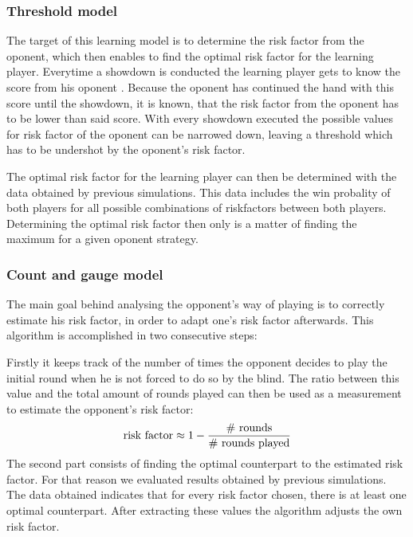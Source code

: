 \documentclass[11pt]{article}
\begin{document}
\subsubsection{Threshold model}

The target of this learning model is to determine the risk factor from the oponent, which then enables to find the optimal risk factor for the learning player.
Everytime a showdown is conducted the learning player gets to know the score from his oponent . Because the oponent has continued the hand with this score until the showdown, it is known, that the risk factor from the oponent has to be lower than said score. With every showdown executed the possible values for risk factor of the oponent can be narrowed down, leaving a threshold which has to be undershot by the oponent's risk factor.


The optimal risk factor for the learning player can then be determined with the data obtained by previous simulations. This data includes the win probality of both players for all possible combinations of riskfactors between both players. Determining the optimal risk factor then only is a matter of finding the maximum for a given oponent strategy.

\subsubsection{Count and gauge model}

The main goal behind analysing the opponent’s way of playing is to correctly estimate his risk factor, in order to adapt one’s risk factor afterwards. 
This algorithm is accomplished in two consecutive steps:
 
Firstly it keeps track of the number of times the opponent decides to play the initial round when he is not forced to do so by the blind. The ratio between this value and the total amount of rounds played can then be used as a measurement to estimate the opponent’s risk factor:
 $$
\textnormal{risk factor} \approx 1 - \dfrac{\textnormal{\# rounds}}{\textnormal{\# rounds played}}
 $$
The second part consists of finding the optimal counterpart to the estimated risk factor. For that reason we evaluated results obtained by previous simulations. The data obtained indicates that for every risk factor chosen, there is at least one optimal counterpart. After extracting these values the algorithm adjusts the own risk factor.

 
\end{document}
